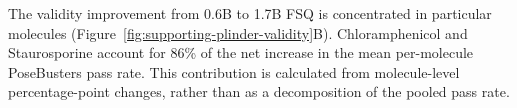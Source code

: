 The validity improvement from 0.6B to 1.7B FSQ is concentrated in particular molecules
(Figure~\ref{fig:supporting-plinder-validity}B).
Chloramphenicol and Staurosporine account for 86\% of the net increase in the mean
per-molecule PoseBusters pass rate. This contribution is calculated from molecule-level
percentage-point changes, rather than as a decomposition of the pooled pass rate.
